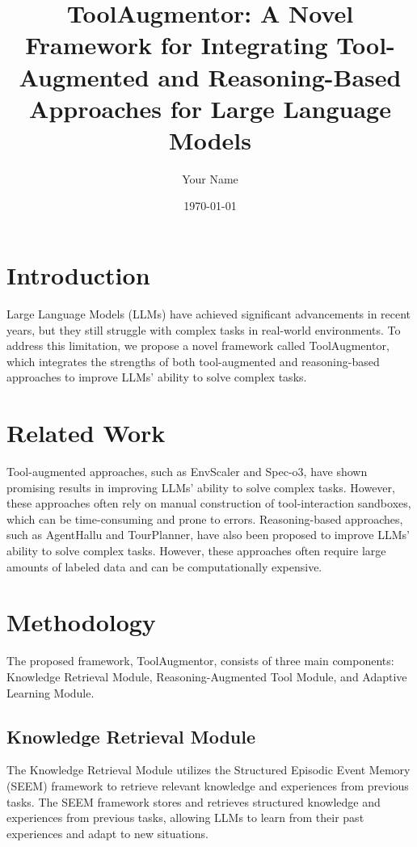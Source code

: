 \documentclass[12pt, a4paper]{article}
\title{ToolAugmentor: A Novel Framework for Integrating Tool-Augmented and Reasoning-Based Approaches for Large Language Models}
\author{Your Name}
\date{\today}
\begin{document}
\maketitle

\section{Introduction}
\label{sec:introduction}
Large Language Models (LLMs) have achieved significant advancements in recent years, but they still struggle with complex tasks in real-world environments. To address this limitation, we propose a novel framework called ToolAugmentor, which integrates the strengths of both tool-augmented and reasoning-based approaches to improve LLMs' ability to solve complex tasks.

\section{Related Work}
\label{sec:related_work}
Tool-augmented approaches, such as EnvScaler and Spec-o3, have shown promising results in improving LLMs' ability to solve complex tasks. However, these approaches often rely on manual construction of tool-interaction sandboxes, which can be time-consuming and prone to errors. Reasoning-based approaches, such as AgentHallu and TourPlanner, have also been proposed to improve LLMs' ability to solve complex tasks. However, these approaches often require large amounts of labeled data and can be computationally expensive.

\section{Methodology}
\label{sec:methodology}
The proposed framework, ToolAugmentor, consists of three main components: Knowledge Retrieval Module, Reasoning-Augmented Tool Module, and Adaptive Learning Module.

\subsection{Knowledge Retrieval Module}
\label{subsec:knowledge_retrieval_module}
The Knowledge Retrieval Module utilizes the Structured Episodic Event Memory (SEEM) framework to retrieve relevant knowledge and experiences from previous tasks. The SEEM framework stores and retrieves structured knowledge and experiences from previous tasks, allowing LLMs to learn from their past experiences and adapt to new situations.
\end{document}

